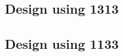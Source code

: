 \subsection{Design using 1313}


 \begin{center}




 \end{center}



\subsection{Design using 1133}


 \begin{center}




 \end{center}



